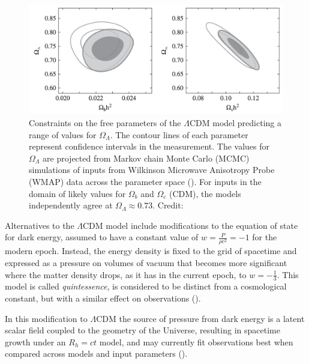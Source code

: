 \documentclass{paper}
\begin{document}
  \begin{figure}[H]
    \begin{centering}
    \includegraphics[scale=0.5]{DE-MCMC.pdf}
    \caption{Constraints on the free parameters of the $\Lambda$CDM
      model predicting a range of values for \(\Omega_{\Lambda}\). The contour 
      lines of each parameter represent confidence intervals in the 
      measurement. The values for \(\Omega_{\Lambda}\) are projected from
      Markov chain Monte Carlo (MCMC) simulations of inputs from Wilkinson 
      Microwave Anisotropy Probe (WMAP) data across the parameter space 
      (\cite{Bennett_2011}). For inputs in the domain of likely values for 
      \(\Omega_b\) and \(\Omega_c\) (CDM), the models independently agree at 
      \(\Omega_{\Lambda} \approx 0.73\).
    Credit: \cite{liddle2015introduction}}
    \label{fig:DE-MCMC}
    \end{centering}
  \end{figure}

  Alternatives to the $\Lambda$CDM model include modifications to the equation 
  of state for dark energy, assumed to have a constant value of 
  \(w = \frac{P}{\rho c^2} = -1\) for the modern epoch.  Instead, the energy 
  density is fixed to the grid of spacetime and expressed as a pressure on 
  volumes of vacuum that becomes more significant where the matter density 
  drops, as it has in the current epoch, to \(w = -\frac{1}{3}\). This model 
  is called \textit{quintessence}, is considered to be distinct from a 
  cosmological constant, but with a similar effect on observations
  (\cite{PhysRevLett.80.1582}). 

  In this modification to $\Lambda$CDM the source of pressure from dark energy 
  is a latent scalar field coupled to the geometry of the Universe, resulting 
  in spacetime growth under an \(R_h = ct\) model, and may currently fit 
  observations best when compared across models and input parameters 
  (\cite{10.1093/mnras/sty1962}).
\end{document}
